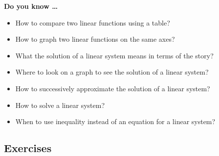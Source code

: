 


\noindent \textbf{Do you know \ldots}

\begin{itemize} 
\item How to compare two linear functions using a table? 
\item How to graph two linear functions on the same axes? 
\item What the solution of a linear system means in terms of the story? 
\item Where to look on a graph to see the solution of a linear system? 
\item How to successively approximate the solution of a linear system? 
\item How to solve a linear system? 
\item When to use inequality instead of an equation for a linear system? 
   
\end{itemize}

\subsection*{Exercises}


